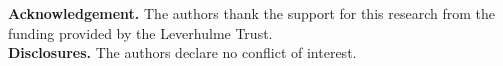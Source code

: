 \documentclass[final,  3p]{elsarticle}
\begin{document}
\noindent \textbf{Acknowledgement.} The authors thank the support for this research from the funding provided by the Leverhulme Trust. \\
  
\noindent \textbf{Disclosures.} The authors declare no conflict of interest. \\


 


\newpage
\appendix
\onecolumn
\end{document}
